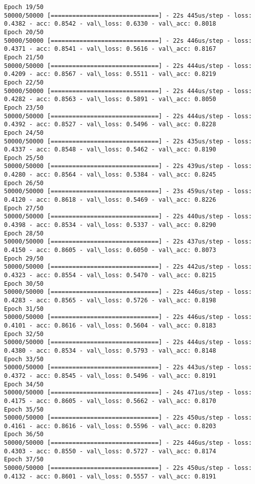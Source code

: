 \documentclass[11pt]{article}
\begin{document}
\begin{Verbatim}[commandchars=\\\{\}]
Epoch 19/50
50000/50000 [==============================] - 22s 445us/step - loss: 0.4382 - acc: 0.8542 - val\_loss: 0.6330 - val\_acc: 0.8018
Epoch 20/50
50000/50000 [==============================] - 22s 446us/step - loss: 0.4371 - acc: 0.8541 - val\_loss: 0.5616 - val\_acc: 0.8167
Epoch 21/50
50000/50000 [==============================] - 22s 444us/step - loss: 0.4209 - acc: 0.8567 - val\_loss: 0.5511 - val\_acc: 0.8219
Epoch 22/50
50000/50000 [==============================] - 22s 444us/step - loss: 0.4282 - acc: 0.8563 - val\_loss: 0.5891 - val\_acc: 0.8050
Epoch 23/50
50000/50000 [==============================] - 22s 444us/step - loss: 0.4392 - acc: 0.8527 - val\_loss: 0.5496 - val\_acc: 0.8228
Epoch 24/50
50000/50000 [==============================] - 22s 435us/step - loss: 0.4337 - acc: 0.8548 - val\_loss: 0.5462 - val\_acc: 0.8190
Epoch 25/50
50000/50000 [==============================] - 22s 439us/step - loss: 0.4280 - acc: 0.8564 - val\_loss: 0.5384 - val\_acc: 0.8245
Epoch 26/50
50000/50000 [==============================] - 23s 459us/step - loss: 0.4120 - acc: 0.8618 - val\_loss: 0.5469 - val\_acc: 0.8226
Epoch 27/50
50000/50000 [==============================] - 22s 440us/step - loss: 0.4398 - acc: 0.8534 - val\_loss: 0.5337 - val\_acc: 0.8290
Epoch 28/50
50000/50000 [==============================] - 22s 437us/step - loss: 0.4150 - acc: 0.8605 - val\_loss: 0.6050 - val\_acc: 0.8073
Epoch 29/50
50000/50000 [==============================] - 22s 442us/step - loss: 0.4323 - acc: 0.8554 - val\_loss: 0.5470 - val\_acc: 0.8215
Epoch 30/50
50000/50000 [==============================] - 22s 446us/step - loss: 0.4283 - acc: 0.8565 - val\_loss: 0.5726 - val\_acc: 0.8198
Epoch 31/50
50000/50000 [==============================] - 22s 446us/step - loss: 0.4101 - acc: 0.8616 - val\_loss: 0.5604 - val\_acc: 0.8183
Epoch 32/50
50000/50000 [==============================] - 22s 444us/step - loss: 0.4380 - acc: 0.8534 - val\_loss: 0.5793 - val\_acc: 0.8148
Epoch 33/50
50000/50000 [==============================] - 22s 443us/step - loss: 0.4372 - acc: 0.8545 - val\_loss: 0.5496 - val\_acc: 0.8191
Epoch 34/50
50000/50000 [==============================] - 24s 471us/step - loss: 0.4175 - acc: 0.8605 - val\_loss: 0.5662 - val\_acc: 0.8170
Epoch 35/50
50000/50000 [==============================] - 22s 450us/step - loss: 0.4161 - acc: 0.8616 - val\_loss: 0.5596 - val\_acc: 0.8203
Epoch 36/50
50000/50000 [==============================] - 22s 446us/step - loss: 0.4303 - acc: 0.8550 - val\_loss: 0.5727 - val\_acc: 0.8174
Epoch 37/50
50000/50000 [==============================] - 22s 450us/step - loss: 0.4132 - acc: 0.8601 - val\_loss: 0.5557 - val\_acc: 0.8191

\end{Verbatim}
\end{document}
